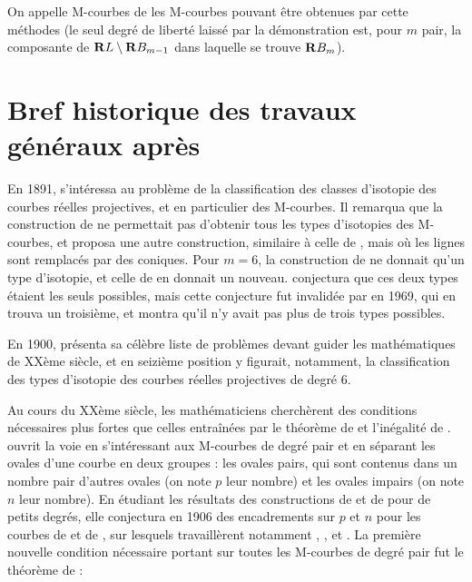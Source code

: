 \documentclass{livre}
\begin{document}
On appelle M-courbes de  les M-courbes pouvant être obtenues par cette méthodes (le seul degré de liberté laissé par la démonstration est, pour $m$ pair, la composante de $\mathbf{R} L \setminus \mathbf{R} B_{m-1} $ dans laquelle se trouve $\mathbf{R} B_m $). 

\section{Bref historique des travaux généraux après }

En 1891,  s'intéressa au problème de la classification des classes d'isotopie des courbes réelles projectives, et en particulier des M-courbes. Il remarqua que la construction de  ne permettait pas d'obtenir tous les types d'isotopies des M-courbes, et proposa une autre construction, similaire à celle de , mais où les lignes sont remplacés par des coniques. Pour $ m= 6 $, la construction de  ne donnait qu'un type d'isotopie, et celle de  en donnait un nouveau.  conjectura que ces deux types étaient les seuls possibles, mais cette conjecture fut invalidée par  en 1969, qui en trouva un troisième, et montra qu'il n'y avait pas plus de trois types possibles.


En 1900,  présenta sa célèbre liste de problèmes devant guider les mathématiques de XXème siècle, et en seizième position y figurait, notamment, la classification des types d'isotopie des courbes réelles projectives de degré 6. 

Au cours du XXème siècle, les mathématiciens cherchèrent des conditions nécessaires plus fortes que celles entraînées par le théorème de  et l'inégalité de .  ouvrit la voie en s'intéressant aux M-courbes de degré pair et en séparant les ovales d'une courbe en deux groupes : les ovales pairs, qui sont contenus dans un nombre pair d'autres ovales (on note $p$ leur nombre) et les ovales impairs (on note $n$ leur nombre). En étudiant les résultats des constructions de  et de  pour de petits degrés, elle conjectura en 1906 des encadrements sur $p$ et $n$ pour les courbes de  et de , sur lesquels travaillèrent notamment , , et . La première nouvelle condition nécessaire portant sur toutes les M-courbes de degré pair fut le théorème de  :

\end{document}
